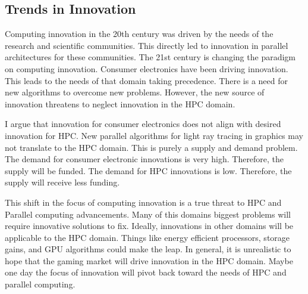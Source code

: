 \subsection{Trends in Innovation}
Computing innovation in the 20th century was driven by the needs of the research and scientific communities.
This directly led to innovation in parallel architectures for these communities.
The 21st century is changing the paradigm on computing innovation.
Consumer electronics have been driving innovation.
This leads to the needs of that domain taking precedence.
There is a need for new algorithms to overcome new problems.
However, the new source of innovation threatens to neglect innovation in the HPC domain.

\par
I argue that innovation for consumer electronics does not align with desired innovation for HPC.
New parallel algorithms for light ray tracing in graphics may not translate to the HPC domain.
This is purely a supply and demand problem. 
The demand for consumer electronic innovations is very high.
Therefore, the supply will be funded.
The demand for HPC innovations is low.
Therefore, the supply will receive less funding.

\par 
This shift in the focus of computing innovation is a true threat to HPC and Parallel computing advancements.
Many of this domains biggest problems will require innovative solutions to fix.
Ideally, innovations in other domains will be applicable to the HPC domain.
Things like energy efficient processors, storage gains, and GPU algorithms could make the leap.
In general, it is unrealistic to hope that the gaming market will drive innovation in the HPC domain. 
Maybe one day the focus of innovation will pivot back toward the needs of HPC and parallel computing.
